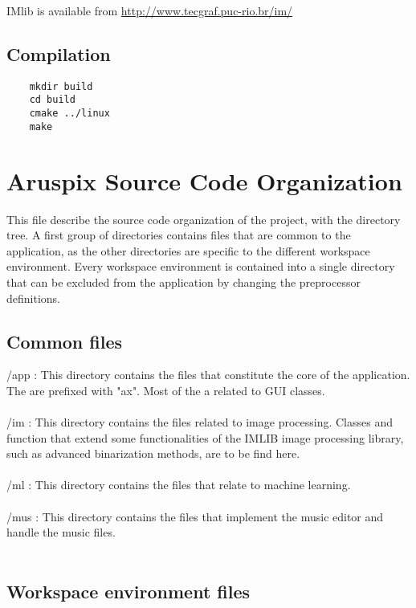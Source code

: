 \documentclass[]{article}
\begin{document}
 IMlib is available from \url{http://www.tecgraf.puc-rio.br/im/}
\subsection{Compilation}

 \begin{verbatim}
	mkdir build
	cd build
	cmake ../linux
	make
 \end{verbatim}

\section{Aruspix Source Code Organization}

This file describe the source code organization of the project, with the directory tree.
A first group of directories contains files that are common to the application, as the
other directories are specific to the different workspace environment. Every workspace
environment is contained into a single directory that can be excluded from the application
by changing the preprocessor definitions.\\

\subsection{Common files}

/app : This directory contains the files that constitute the core of the application.
The are prefixed with "ax". Most of the a related to GUI classes.\\\\
/im : This directory contains the files related to image processing. Classes and
function that extend some functionalities of the IMLIB image processing library,
such as advanced binarization methods, are to be find here.\\\\
/ml : This directory contains the files that relate to machine learning.\\\\
/mus : This directory contains the files that implement the music editor and handle the music files.\\\\

\subsection{Workspace environment files}
\end{document}
